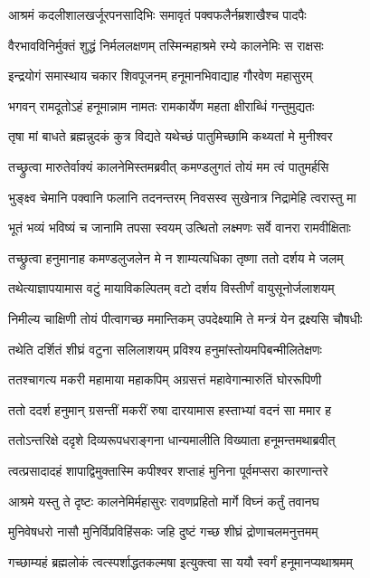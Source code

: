\twolineshloka
{आश्रमं कदलीशालखर्जूरपनसादिभिः}
{समावृतं पक्वफलैर्नम्रशाखैश्च पादपैः} %

\twolineshloka
{वैरभावविनिर्मुक्तं शुद्धं निर्मललक्षणम्}
{तस्मिन्महाश्रमे रम्ये कालनेमिः स राक्षसः} %

\twolineshloka
{इन्द्रयोगं समास्थाय चकार शिवपूजनम्}
{हनूमानभिवाद्याह गौरवेण महासुरम्} %

\twolineshloka
{भगवन् रामदूतोऽहं हनूमान्नाम नामतः}
{रामकार्येण महता क्षीराब्धिं गन्तुमुद्यतः} %

\twolineshloka
{तृषा मां बाधते ब्रह्मन्नुदकं कुत्र विद्यते}
{यथेच्छं पातुमिच्छामि कथ्यतां मे मुनीश्वर} %

\twolineshloka
{तच्छ्रुत्वा मारुतेर्वाक्यं कालनेमिस्तमब्रवीत्}
{कमण्डलुगतं तोयं मम त्वं पातुमर्हसि} %

\twolineshloka
{भुङ्क्ष्व चेमानि पक्वानि फलानि तदनन्तरम्}
{निवसस्व सुखेनात्र निद्रामेहि त्वरास्तु मा} %

\twolineshloka
{भूतं भव्यं भविष्यं च जानामि तपसा स्वयम्}
{उत्थितो लक्ष्मणः सर्वे वानरा रामवीक्षिताः} %

\twolineshloka
{तच्छ्रुत्वा हनुमानाह कमण्डलुजलेन मे}
{न शाम्यत्यधिका तृष्णा ततो दर्शय मे जलम्} %

\twolineshloka
{तथेत्याज्ञापयामास वटुं मायाविकल्पितम्}
{वटो दर्शय विस्तीर्णं वायुसूनोर्जलाशयम्} %

\twolineshloka
{निमील्य चाक्षिणी तोयं पीत्वागच्छ ममान्तिकम्}
{उपदेक्ष्यामि ते मन्त्रं येन द्रक्ष्यसि चौषधीः} %

\twolineshloka
{तथेति दर्शितं शीघ्रं वटुना सलिलाशयम्}
{प्रविश्य हनुमांस्तोयमपिबन्मीलितेक्षणः} %

\twolineshloka
{ततश्चागत्य मकरी महामाया महाकपिम्}
{अग्रसत्तं महावेगान्मारुतिं घोररूपिणी} %

\twolineshloka
{ततो ददर्श हनुमान् ग्रसन्तीं मकरीं रुषा}
{दारयामास हस्ताभ्यां वदनं सा ममार ह} %

\twolineshloka
{ततोऽन्तरिक्षे ददृशे दिव्यरूपधराङ्गना}
{धान्यमालीति विख्याता हनूमन्तमथाब्रवीत्} %

\twolineshloka
{त्वत्प्रसादादहं शापाद्विमुक्तास्मि कपीश्वर}
{शप्ताहं मुनिना पूर्वमप्सरा कारणान्तरे} %

\twolineshloka
{आश्रमे यस्तु ते दृष्टः कालनेमिर्महासुरः}
{रावणप्रहितो मार्गे विघ्नं कर्तुं तवानघ} %

\twolineshloka
{मुनिवेषधरो नासौ मुनिर्विप्रविहिंसकः}
{जहि दुष्टं गच्छ शीघ्रं द्रोणाचलमनुत्तमम्} %

\twolineshloka
{गच्छाम्यहं ब्रह्मलोकं त्वत्स्पर्शाद्धतकल्मषा}
{इत्युक्त्वा सा ययौ स्वर्गं हनूमानप्यथाश्रमम्} %

